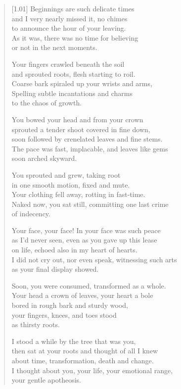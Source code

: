 \begin{verse}[1.01\textwidth]
Beginnings are such delicate times\\
and I very nearly missed it, no chimes\\
to announce the hour of your leaving.\\
As it was, there was no time for believing\\
or not in the next moments.

Your fingers crawled beneath the soil\\
and sprouted roots, flesh starting to roil.\\
Coarse bark spiraled up your wrists and arms,\\
Spelling subtle incantations and charms\\
to the chaos of growth.

You bowed your head and from your crown\\
sprouted a tender shoot covered in fine down,\\
soon followed by crenelated leaves and fine stems.\\
The pace was fast, implacable, and leaves like gems\\
soon arched skyward.

You sprouted and grew, taking root\\
in one smooth motion, fixed and mute.\\
Your clothing fell away, rotting in fast-time.\\
Naked now, you sat still, committing one last crime\\
of indecency.

Your face, your face! In your face was such peace\\
as I'd never seen, even as you gave up this lease\\
on life, echoed also in my heart of hearts.\\
I did not cry out, nor even speak, witnessing such arts\\
as your final display showed.

Soon, you were consumed, transformed as a whole.\\
Your head a crown of leaves, your heart a bole\\
bored in rough bark and sturdy wood,\\
your fingers, knees, and toes stood\\
as thirsty roots.

I stood a while by the tree that was you,\\
then sat at your roots and thought of all I knew\\
about time, transformation, death and change.\\
I thought about you, your life, your emotional range,\\
your gentle apotheosis.


\end{verse}
